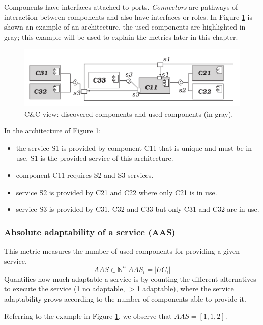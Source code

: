 Components have interfaces attached to ports. \emph{Connectors} are pathways of interaction between components and also have interfaces or roles. In Figure \ref{fig:solar-arch-example} is shown an example of an architecture, the used components are highlighted in gray; this example will be used to explain the metrics later in this chapter.

\begin{figure}[h]
	\centerline
	{\includegraphics[scale=0.55]{img/solar-arch-example.png}}
	\caption[SOLAR example architecure]{C\&C view: discovered components and used components (in gray).\cite{solar}}
	\label{fig:solar-arch-example}
\end{figure}

In the architecture of Figure \ref{fig:solar-arch-example}:
\begin{itemize}
	\item the service S1 is provided by component C11 that is unique and must be in use. S1 is the provided service of this architecture.
	\item component C11 requires S2 and S3 services.
	\item service S2 is provided by C21 and C22 where only C21 is in use.
	\item service S3 is provided by C31, C32 and C33 but only C31 and C32 are in use.
\end{itemize}

\subsubsection{Absolute adaptability of a service (AAS)}
This metric measures the number of used components for providing a given service.
\[ AAS \in \mathbb{N}^n |AAS_i = |UC_i|\]
Quantifies how much adaptable a service is by counting the different alternatives to execute the service (1 no adaptable, $>$1 adaptable), where the service adaptability grows according to the number of components able to provide it. 

\noindent Referring to the example in Figure \ref{fig:solar-arch-example}, we observe that $AAS = [1, 1, 2]$.

